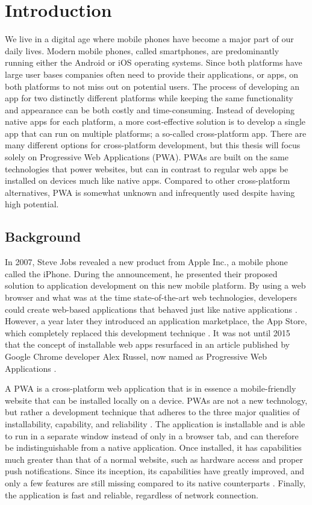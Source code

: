 \documentclass[a4paper,12pt]{article}
\begin{document}
\section{Introduction}
\label{Intro}
We live in a digital age where mobile phones have become a major part of our daily lives. Modern mobile phones, called smartphones, are predominantly running either the Android or iOS operating systems. Since both platforms have large user bases companies often need to provide their applications, or apps, on both platforms to not miss out on potential users. The process of developing an app for two distinctly different platforms while keeping the same functionality and appearance can be both costly and time-consuming. Instead of developing native apps for each platform, a more cost-effective solution is to develop a single app that can run on multiple platforms; a so-called cross-platform app. There are many different options for cross-platform development, but this thesis will focus solely on Progressive Web Applications (PWA). PWAs are built on the same technologies that power websites, but can in contrast to regular web apps be installed on devices much like native apps. Compared to other cross-platform alternatives, PWA is somewhat unknown and infrequently used despite having high potential.

\subsection{Background}
\label{Intro_background}
In 2007, Steve Jobs revealed a new product from Apple Inc., a mobile phone called the iPhone. During the announcement, he presented their proposed solution to application development on this new mobile platform. By using a web browser and what was at the time state-of-the-art web technologies, developers could create web-based applications that behaved just like native applications \cite{stevejobs_pwa}. However, a year later they introduced an application marketplace, the App Store, which completely replaced this development technique \cite{stevejobs_appstore}. It was not until 2015 that the concept of installable web apps resurfaced in an article published by Google Chrome developer Alex Russel, now named as Progressive Web Applications \cite{russel_pwa}.

A PWA is a cross-platform web application that is in essence a mobile-friendly website that can be installed locally on a device. PWAs are not a new technology, but rather a development technique that adheres to the three major qualities of installability, capability, and reliability \cite{whatarepwas}. The application is installable and is able to run in a separate window instead of only in a browser tab, and can therefore be indistinguishable from a native application. Once installed, it has capabilities much greater than that of a normal website, such as hardware access and proper push notifications. Since its inception, its capabilities have greatly improved, and only a few features are still missing compared to its native counterparts \cite{whatwebcando}. Finally, the application is fast and reliable, regardless of network connection.
\end{document}
